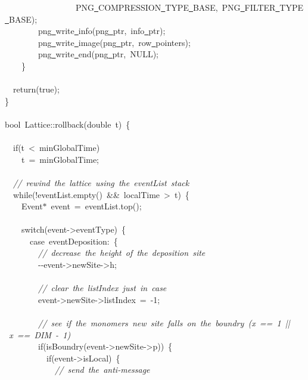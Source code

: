 {\ \ \ \ \ \ \ \ \ \ \ \ \ \ \ \ \ PNG\underline\ COMPRESSION\underline\ TYPE\underline\ BASE,\ PNG\underline\ FILTER\underline\ TYPE\underline\ BASE);\\
\ \ \ \ \ \ \ \ png\underline\ write\underline\ info(png\underline\ ptr,\ info\underline\ ptr);\\
\ \ \ \ \ \ \ \ png\underline\ write\underline\ image(png\underline\ ptr,\ row\underline\ pointers);\\
\ \ \ \ \ \ \ \ png\underline\ write\underline\ end(png\underline\ ptr,\ NULL);\\
\ \ \ \ \}\\
\ \\
\ \ return(true);\\
\}\\
\ \\
bool\ Lattice::rollback(double\ t)\ \{\\
\ \\
\ \ if(t\ <{}\ minGlobalTime)\\
\ \ \ \ t\ =\ minGlobalTime;\\
\ \\
\ \ \textsl{//\ rewind\ the\ lattice\ using\ the\ eventList\ stack}\\
\ \ while(!eventList.empty()\ \&\&\ localTime\ >{}\ t)\ \{\\
\ \ \ \ Event$\ast$\ event\ =\ eventList.top();\\
\ \\
\ \ \ \ switch(event-{}>{}eventType)\ \{\\
\ \ \ \ \ \ case\ eventDeposition:\ \{\\
\ \ \ \ \ \ \ \ \textsl{//\ decrease\ the\ height\ of\ the\ deposition\ site}\\
\ \ \ \ \ \ \ \ -{}-{}event-{}>{}newSite-{}>{}h;\\
\ \\
\ \ \ \ \ \ \ \ \textsl{//\ clear\ the\ listIndex\ just\ in\ case}\\
\ \ \ \ \ \ \ \ event-{}>{}newSite-{}>{}listIndex\ =\ -{}1;\\
\ \\
\ \ \ \ \ \ \ \ \textsl{//\ see\ if\ the\ monomers\ new\ site\ falls\ on\ the\ boundry\ (x\ ==\ 1\ ||\ x\ ==\ DIM\ -{}\ 1)}\\
\ \ \ \ \ \ \ \ if(isBoundry(event-{}>{}newSite-{}>{}p))\ \{\\
\ \ \ \ \ \ \ \ \ \ if(event-{}>{}isLocal)\ \{\\
\ \ \ \ \ \ \ \ \ \ \ \ \textsl{//\ send\ the\ anti-{}message}\\
}
